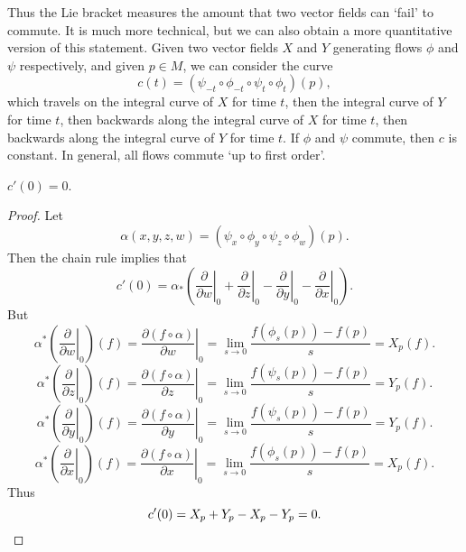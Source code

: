Thus the Lie bracket measures the amount that two vector fields can `fail' to commute. It is much more technical, but we can also obtain a more quantitative version of this statement. Given two vector fields $X$ and $Y$ generating flows $\phi$ and $\psi$ respectively, and given $p \in M$, we can consider the curve
%
\[ c(t) = (\psi_{-t} \circ \phi_{-t} \circ \psi_t \circ \phi_t)(p), \]
%
which travels on the integral curve of $X$ for time $t$, then the integral curve of $Y$ for time $t$, then backwards along the integral curve of $X$ for time $t$, then backwards along the integral curve of $Y$ for time $t$. If $\phi$ and $\psi$ commute, then $c$ is constant. In general, all flows commute `up to first order'.

\begin{lemma}
    $c'(0) = 0$.
\end{lemma}
\begin{proof}
    Let
    \[ \alpha(x,y,z,w) = (\psi_x \circ \phi_y \circ \psi_z \circ \phi_w)(p). \]
    Then the chain rule implies that
    \[ c'(0) = \alpha_* \left( \left. \frac{\partial }{\partial w} \right|_0 + \left. \frac{\partial}{\partial z} \right|_0 - \left. \frac{\partial}{\partial y} \right|_0 - \left. \frac{\partial}{\partial x} \right|_0 \right). \]
    But
    \[ \alpha^* \left( \left. \frac{\partial}{\partial w} \right|_0 \right)(f) = \left. \frac{\partial (f \circ \alpha)}{\partial w} \right|_0 = \lim_{s \to 0} \frac{f(\phi_s(p)) - f(p)}{s} = X_p(f). \]
    \[ \alpha^* \left( \left. \frac{\partial}{\partial z} \right|_0 \right)(f) = \left. \frac{\partial (f \circ \alpha)}{\partial z} \right|_0 = \lim_{s \to 0} \frac{f(\psi_s(p)) - f(p)}{s} = Y_p(f). \]
    \[ \alpha^* \left( \left. \frac{\partial}{\partial y} \right|_0 \right)(f) = \left. \frac{\partial (f \circ \alpha)}{\partial y} \right|_0 = \lim_{s \to 0} \frac{f(\psi_s(p)) - f(p)}{s} = Y_p(f). \]
    \[ \alpha^* \left( \left. \frac{\partial}{\partial x} \right|_0 \right)(f) = \left. \frac{\partial (f \circ \alpha)}{\partial x} \right|_0 = \lim_{s \to 0} \frac{f(\phi_s(p)) - f(p)}{s} = X_p(f). \]
    Thus
    \[ c'(0) = X_p + Y_p - X_p - Y_p = 0. \qedhere \]
\end{proof}

